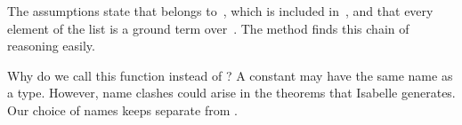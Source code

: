 \begin{isabellebody}
\begin{isamarkuptxt}
\begin{isabelle}
\end{isabelle}
The assumptions state that  belongs 
to~, which is included in~, and that every element of the list  is
a ground term over~.  The  method finds this chain of reasoning easily.%
\end{isamarkuptxt}%
\isamarkuptrue%
%
\endisatagproof
{\isafoldproof}%
%
\isadelimproof
%
\endisadelimproof
%
\begin{isamarkuptext}%
\begin{warn}
Why do we call this function  instead 
of ?  A constant may have the same name as a type.  However,
name  clashes could arise in the theorems that Isabelle generates. 
Our choice of names keeps  separate from 
.
\end{warn}


\end{isamarkuptext}
\end{isabellebody}
